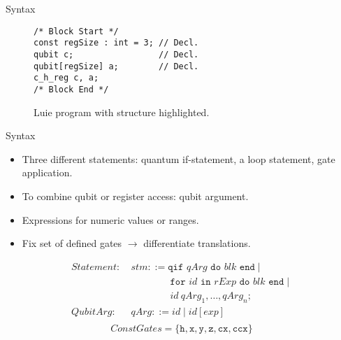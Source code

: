 \begin{frame}[fragile]{Syntax}
\begin{minipage}{.50\textwidth}
\begin{figure}[htp]
\begin{lstlisting}[style=Luie, basicstyle=\ttfamily\large]
/* Block Start */
const regSize : int = 3; // Decl.
qubit c;                 // Decl.
qubit[regSize] a;        // Decl.
c_h_reg c, a;           
/* Block End */
            \end{lstlisting}
            \caption{Luie program with structure highlighted.}
        \end{figure}
    \end{minipage}
\end{frame}


\newcommand{\adown}{\rotatebox[origin=c]{90}{$\Lsh$}}
\newcommand{\aup}{\rotatebox[origin=c]{90}{$\Rsh$}}
\begin{frame}[fragile]{Syntax}
    \begin{minipage}{.45\textwidth}
        \begin{itemize}
            \item Three different statements: quantum if-statement, a loop statement, gate application.
            \item To combine qubit or register access: qubit argument.
            \item Expressions for numeric values or ranges.
            \item Fix set of defined gates $\to$ differentiate translations.
        \end{itemize}
        \Large
        \begin{align*}
            Statement: \ & stm ::= \texttt{qif } qArg \texttt{ do }  blk \texttt{ end} \mid\\
            & \quad \quad \quad \quad \texttt{for } id \texttt{ in } rExp \texttt{ do } blk \texttt{ end} \mid \\
            & \quad \quad \quad \quad id \ qArg_1, \dots, qArg_n \texttt{;}\\
            QubitArg: \ & qArg ::= id \mid id[exp]\\
    \end{align*}
    \vspace{\alignmargin}
    \begin{equation*}
        ConstGates = \{\texttt{h}, \texttt{x}, \texttt{y}, \texttt{z}, \texttt{cx}, \texttt{ccx}\}
    \end{equation*}

\end{minipage}
\end{frame}
